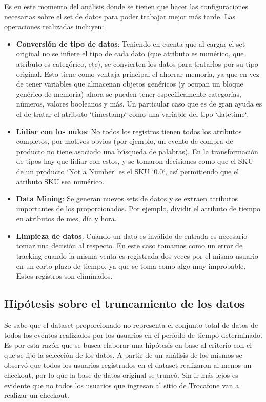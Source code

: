 \documentclass[a4paper]{article}
\begin{document}
Es en este momento del análisis donde se tienen que hacer las configuraciones necesarias sobre el set de datos para poder trabajar mejor más tarde. Las operaciones realizadas incluyen:

\begin{itemize}
\item \textbf{Conversión de tipo de datos}: Teniendo en cuenta que al cargar el set original no se infiere el tipo de cada dato (que atributo es numérico, que atributo es categórico, etc), se convierten los datos para tratarlos por su tipo original. Esto tiene como ventaja principal el ahorrar memoria, ya que en vez de tener variables que almacenan objetos genéricos (y ocupan un bloque genérico de memoria) ahora se pueden tener específicamente categorías, números, valores booleanos y más. Un particular caso que es de gran ayuda es el de tratar el atributo `timestamp` como una variable del tipo `datetime`.
\item \textbf{Lidiar con los nulos}: No todos los registros tienen todos los atributos completos, por motivos obvios (por ejemplo, un evento de compra de producto no tiene asociado una búsqueda de palabras). En la transformación de tipos hay que lidiar con estos, y se tomaron decisiones como que el SKU de un producto `Not a Number` es el SKU `0.0`, así permitiendo que el atributo SKU sea numérico.
\item \textbf{Data Mining}: Se generan nuevos sets de datos y se extraen atributos importantes de los proporcionados. Por ejemplo, dividir el atributo de tiempo en atributos de mes, día y hora.
\item \textbf{Limpieza de datos}: Cuando un dato es inválido de entrada es necesario tomar una decisión al respecto. En este caso tomamos como un error de tracking cuando la misma venta es registrada dos veces por el mismo usuario en un corto plazo de tiempo, ya que se toma como algo muy improbable. Estos registros son eliminados.
\end{itemize}

\subsection{Hipótesis sobre el truncamiento de los datos}

Se sabe que el dataset proporcionado no representa el conjunto total de datos de todos los eventos realizados por los usuarios en el período de tiempo determinado. Es por esta razón que se busca elaborar una hipótesis en base al criterio con el que se fijó la selección de los datos. A partir de un análisis de los mismos se observó que todos los usuarios registrados en el dataset realizaron al menos un checkout, por lo que la base de datos original se truncó. Sin ir más lejos es evidente que no todos los usuarios que ingresan al sitio de Trocafone van a realizar un checkout.
\end{document}
